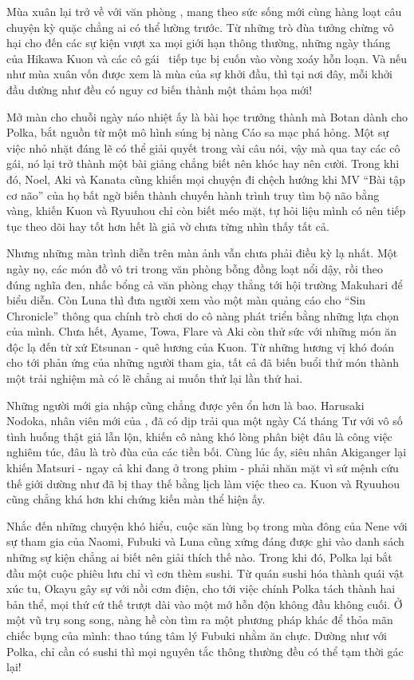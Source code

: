 \documentclass[main.tex]{subfiles}
\begin{document}
\color{black}

Mùa xuân lại trở về với văn phòng \hll, mang theo sức sống mới cùng hàng loạt câu chuyện kỳ quặc chẳng ai có thể lường trước. Từ những trò đùa tưởng chừng vô hại cho đến các sự kiện vượt xa mọi giới hạn thông thường, những ngày tháng của Hikawa Kuon và các cô gái \hll\ tiếp tục bị cuốn vào vòng xoáy hỗn loạn. Và nếu như mùa xuân vốn được xem là mùa của sự khởi đầu, thì tại nơi đây, mỗi khởi đầu dường như đều có nguy cơ biến thành một thảm họa mới!

Mở màn cho chuỗi ngày náo nhiệt ấy là bài học trưởng thành mà Botan dành cho Polka, bắt nguồn từ một mô hình súng bị nàng Cáo sa mạc phá hỏng. Một sự việc nhỏ nhặt đáng lẽ có thể giải quyết trong vài câu nói, vậy mà qua tay các cô gái, nó lại trở thành một bài giảng chẳng biết nên khóc hay nên cười. Trong khi đó, Noel, Aki và Kanata cũng khiến mọi chuyện đi chệch hướng khi MV ``Bài tập cơ não'' của họ bất ngờ biến thành chuyến hành trình truy tìm bộ não bằng vàng, khiến Kuon và Ryuuhou chỉ còn biết méo mặt, tự hỏi liệu mình có nên tiếp tục theo dõi hay tốt hơn hết là giả vờ chưa từng nhìn thấy tất cả.

Nhưng những màn trình diễn trên màn ảnh vẫn chưa phải điều kỳ lạ nhất. Một ngày nọ, các món đồ vô tri trong văn phòng bỗng đồng loạt nổi dậy, rồi theo đúng nghĩa đen, nhấc bổng cả văn phòng chạy thẳng tới hội trường Makuhari để biểu diễn. Còn Luna thì đưa người xem vào một màn quảng cáo cho ``Sin Chronicle'' thông qua chính trò chơi do cô nàng phát triển bằng những lựa chọn của mình. Chưa hết, Ayame, Towa, Flare và Aki còn thử sức với những món ăn độc lạ đến từ xứ Etsunan - quê hương của Kuon. Từ những hương vị khó đoán cho tới phản ứng của những người tham gia, tất cả đã biến buổi thử món thành một trải nghiệm mà có lẽ chẳng ai muốn thử lại lần thứ hai.

Những người mới gia nhập cũng chẳng được yên ổn hơn là bao. Harusaki Nodoka, nhân viên mới của \hll, đã có dịp trải qua một ngày Cá tháng Tư với vô số tình huống thật giả lẫn lộn, khiến cô nàng khó lòng phân biệt đâu là công việc nghiêm túc, đâu là trò đùa của các tiền bối. Cùng lúc ấy, siêu nhân Akiganger lại khiến Matsuri - ngay cả khi đang ở trong phim - phải nhăn mặt vì sứ mệnh cứu thế giới dường như đã bị thay thế bằng lịch làm việc theo ca. Kuon và Ryuuhou cũng chẳng khá hơn khi chứng kiến màn thể hiện ấy.

Nhắc đến những chuyện khó hiểu, cuộc săn lùng bọ trong mùa đông của Nene với sự tham gia của Naomi, Fubuki và Luna cũng xứng đáng được ghi vào danh sách những sự kiện chẳng ai biết nên giải thích thế nào. Trong khi đó, Polka lại bắt đầu một cuộc phiêu lưu chỉ vì cơn thèm sushi. Từ quán sushi hóa thành quái vật xúc tu, Okayu gây sự với nồi cơm điện, cho tới việc chính Polka tách thành hai bản thể, mọi thứ cứ thế trượt dài vào một mớ hỗn độn không đầu không cuối. Ở một vũ trụ song song, nàng hề còn tìm ra một phương pháp khác để thỏa mãn chiếc bụng của mình: thao túng tâm lý Fubuki nhằm ăn chực. Dường như với Polka, chỉ cần có sushi thì mọi nguyên tắc thông thường đều có thể tạm thời gác lại!
\end{document}
